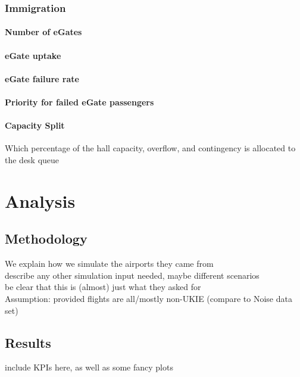 \documentclass[10pt]{article}
\begin{document}
\subsubsection{Immigration}

\paragraph{Number of eGates}

\paragraph{eGate uptake}

\paragraph{eGate failure rate}

\paragraph{Priority for failed eGate passengers}

\paragraph{Capacity Split}
Which percentage of the hall capacity, overflow, and contingency is allocated to the desk queue


\section{Analysis}

\subsection{Methodology}
We explain how we simulate the airports they came from \\
describe any other simulation input needed, maybe different scenarios \\ 
be clear that this is (almost) just what they asked for  \\ Assumption: provided flights are all/mostly non-UKIE (compare to Noise data set)



\subsection{Results}
include KPIs here, as well as some fancy plots
\end{document}
